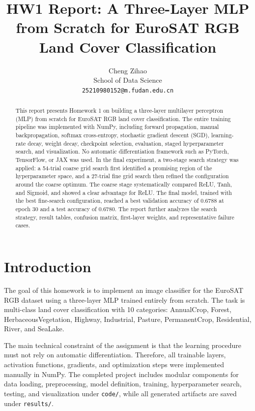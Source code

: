 \documentclass{article}
\title{HW1 Report: A Three-Layer MLP from Scratch for EuroSAT RGB Land Cover Classification}
\author{%
  Cheng Zihao\\
  School of Data Science \\
  \texttt{25210980152@m.fudan.edu.cn}
}
\begin{document}
\maketitle

\begin{abstract}
This report presents Homework 1 on building a three-layer multilayer perceptron (MLP) from scratch for EuroSAT RGB land cover classification. The entire training pipeline was implemented with NumPy, including forward propagation, manual backpropagation, softmax cross-entropy, stochastic gradient descent (SGD), learning-rate decay, weight decay, checkpoint selection, evaluation, staged hyperparameter search, and visualization. No automatic differentiation framework such as PyTorch, TensorFlow, or JAX was used. In the final experiment, a two-stage search strategy was applied: a 54-trial coarse grid search first identified a promising region of the hyperparameter space, and a 27-trial fine grid search then refined the configuration around the coarse optimum. The coarse stage systematically compared ReLU, Tanh, and Sigmoid, and showed a clear advantage for ReLU. The final model, trained with the best fine-search configuration, reached a best validation accuracy of \(0.6788\) at epoch 30 and a test accuracy of \(0.6780\). The report further analyzes the search strategy, result tables, confusion matrix, first-layer weights, and representative failure cases.
\end{abstract}

\section{Introduction}

The goal of this homework is to implement an image classifier for the EuroSAT RGB dataset using a three-layer MLP trained entirely from scratch. The task is multi-class land cover classification with 10 categories: AnnualCrop, Forest, HerbaceousVegetation, Highway, Industrial, Pasture, PermanentCrop, Residential, River, and SeaLake.

The main technical constraint of the assignment is that the learning procedure must not rely on automatic differentiation. Therefore, all trainable layers, activation functions, gradients, and optimization steps were implemented manually in NumPy. The completed project includes modular components for data loading, preprocessing, model definition, training, hyperparameter search, testing, and visualization under \texttt{code/}, while all generated artifacts are saved under \texttt{results/}.
\end{document}
